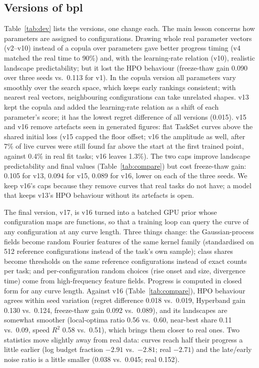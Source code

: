 \documentclass[10pt]{article}
\newcommand{\bpl}{\textsf{bpl}}
\begin{document}
\subsection{Versions of \bpl{}}
Table~\ref{tab:dev} lists the versions, one change each. The main lesson concerns how parameters are assigned to
configurations. Drawing whole real parameter vectors (v2--v10) instead of a copula over parameters gave better
progress timing (v4 matched the real time to 90\%) and, with the learning-rate relation (v10), realistic landscape
predictability; but it lost the HPO behaviour (freeze-thaw gain 0.090 over three seeds vs.\ 0.113 for v1). In the
copula version all parameters vary smoothly over the search space, which keeps early rankings consistent; with
nearest real vectors, neighbouring configurations can take unrelated shapes. v13 kept the copula and added the
learning-rate relation as a shift of each parameter's score; it has the lowest regret difference of all versions
(0.015). v15 and
v16 remove artefacts seen in generated figures: flat TaskSet curves above the shared initial loss (v15 capped the
floor offset; v16 the amplitude as well, after 7\% of live curves were still found far above the start at the first
trained point, against 0.4\% in real fit tasks; v16 leaves 1.3\%). The two caps improve landscape predictability and final values
(Table~\ref{tab:compare}) but cost freeze-thaw gain: 0.105 for v13, 0.094 for v15, 0.089 for v16, lower on each of
the three seeds. We keep v16's caps because they remove curves that real tasks do not have; a model that keeps
v13's HPO behaviour without its artefacts is open.

The final version, v17, is v16 turned into a batched GPU prior whose configuration maps are functions, so that a
training loop can query the curve of any configuration at any curve length. Three things change: the Gaussian-process
fields become random Fourier features of the same kernel family (standardised on 512 reference configurations instead
of the task's own sample); class shares become thresholds on the same reference configurations instead of exact counts
per task; and per-configuration random choices (rise onset and size, divergence time) come from high-frequency feature
fields. Progress is computed in closed form for any curve length. Against v16 (Table~\ref{tab:compare}), HPO
behaviour agrees within seed variation (regret difference 0.018 vs.\
0.019, Hyperband gain 0.130 vs.\ 0.124, freeze-thaw gain 0.092 vs.\ 0.089), and its landscapes are somewhat smoother
(local-optima ratio 0.56 vs.\ 0.60, near-best share 0.11 vs.\ 0.09, speed $R^2$ 0.58 vs.\ 0.51), which brings them
closer to real ones. Two statistics move slightly away from real data: curves reach half their progress a little
earlier (log budget fraction $-2.91$ vs.\ $-2.81$; real $-2.71$) and the late/early noise ratio is a little smaller
(0.038 vs.\ 0.045; real 0.152).
\end{document}
